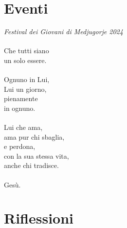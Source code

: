 \section{Eventi}
\begin{haiku}
\emph{Festival dei Giovani di Medjugorje 2024}\\
\leavevmode\\
Che tutti siano\\
un solo essere.\\
\leavevmode\\
Ognuno in Lui,\\
Lui un giorno,\\
pienamente\\
in ognuno.\\
\leavevmode\\
Lui che ama,\\
ama pur chi sbaglia,\\
e perdona,\\
con la sua stessa vita,\\
anche chi tradisce.\\
\leavevmode\\
Gesù.\\
\end{haiku}


\section{Riflessioni}

